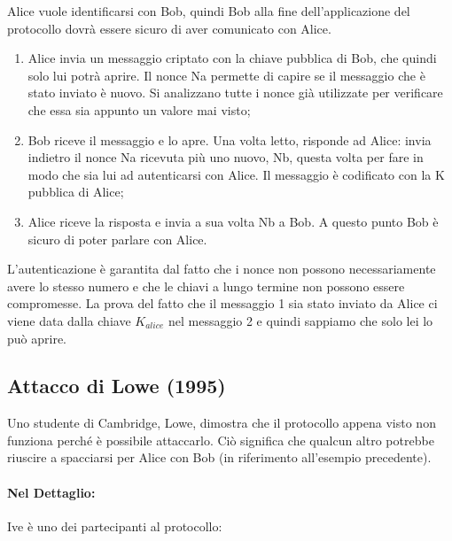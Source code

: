 Alice vuole identificarsi con Bob, quindi Bob alla fine dell’applicazione del protocollo dovrà essere
sicuro di aver comunicato con Alice.
\begin{enumerate}
    \item Alice invia un messaggio criptato con la
          chiave pubblica di Bob, che quindi solo lui potrà
          aprire. Il nonce Na permette di capire se il
          messaggio che è stato inviato è nuovo. Si
          analizzano tutte i nonce già utilizzate per
          verificare che essa sia appunto un valore mai
          visto;
    \item Bob riceve il messaggio e lo apre. Una volta
          letto, risponde ad Alice: invia indietro il nonce
          Na ricevuta più uno nuovo, Nb, questa volta
          per fare in modo che sia lui ad autenticarsi con
          Alice. Il messaggio è codificato con la K
          pubblica di Alice;
    \item Alice riceve la risposta e invia a sua volta
          Nb a Bob. A questo punto Bob è sicuro di poter
          parlare con Alice.
\end{enumerate}

L’autenticazione è garantita dal fatto che i nonce non
possono necessariamente avere lo stesso
numero e che le chiavi a lungo termine non possono
essere compromesse.
La prova del fatto che il messaggio 1 sia stato inviato
da Alice ci viene data dalla chiave \(K_{alice}\) nel
messaggio 2 e quindi sappiamo che solo lei lo può aprire.

\subsection{Attacco di Lowe (1995)}

Uno studente di Cambridge, Lowe, dimostra che il protocollo appena visto non funziona perché è
possibile attaccarlo. Ciò significa che qualcun altro potrebbe riuscire a spacciarsi per Alice con Bob
(in riferimento all’esempio precedente).

\paragraph{Nel Dettaglio: }
Ive è uno dei partecipanti al protocollo:


